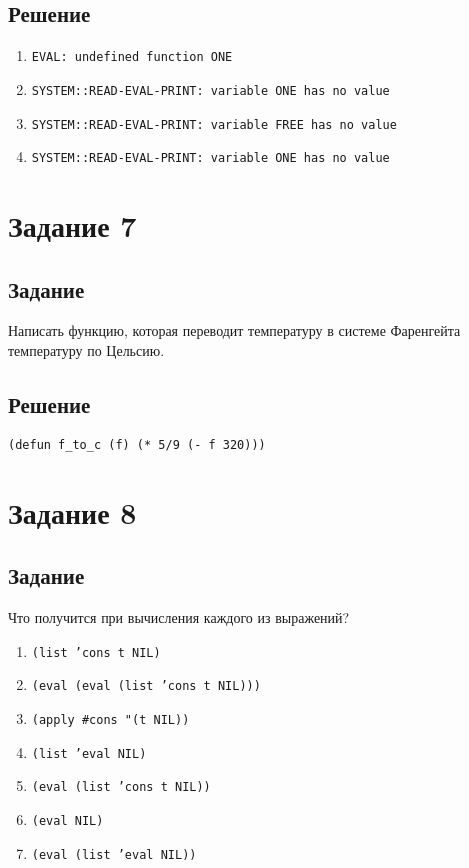 \subsection*{Решение}
\begin{enumerate}
	\item \texttt{EVAL: undefined function ONE}
	\item \texttt{SYSTEM::READ-EVAL-PRINT: variable ONE has no value}
	\item \texttt{SYSTEM::READ-EVAL-PRINT: variable FREE has no value}
	\item \texttt{SYSTEM::READ-EVAL-PRINT: variable ONE has no value}
\end{enumerate}

\section{Задание 7}
\subsection*{Задание}
Написать функцию, которая переводит температуру в системе Фаренгейта температуру по Цельсию.


\subsection*{Решение}
\begin{code}
\begin{verbatim}
(defun f_to_c (f) (* 5/9 (- f 320)))
\end{verbatim}
\end{code}

\section{Задание 8}
\subsection*{Задание}
Что получится при вычисления каждого из выражений?

\begin{enumerate}
	\item \texttt{(list 'cons t NIL)}
	\item \texttt{(eval (eval (list 'cons t NIL)))}
	\item \texttt{(apply \#cons "(t NIL))}
	\item \texttt{(list 'eval NIL)}
	\item \texttt{(eval (list 'cons t NIL))}
	\item \texttt{(eval NIL)}
	\item \texttt{(eval (list 'eval NIL))}
\end{enumerate}


